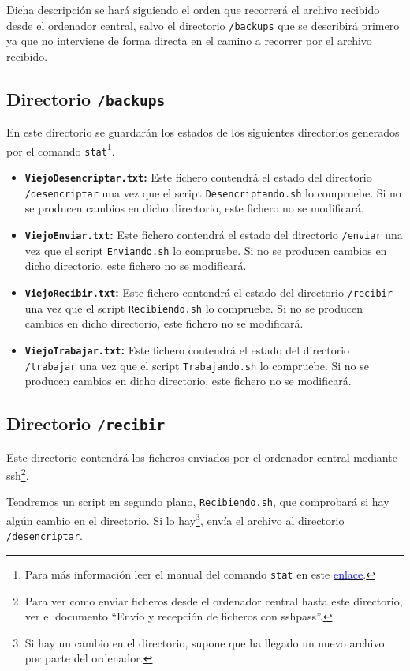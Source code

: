 \documentclass[12pt,letterpaper]{article}
\begin{document}
Dicha descripción se hará siguiendo el orden que recorrerá el archivo recibido desde el ordenador central, salvo el directorio \texttt{/backups} que se describirá primero ya que no interviene de forma directa en el camino a recorrer por el archivo recibido.

\subsection{Directorio \texttt{/backups}}
En este directorio se guardarán los estados de los siguientes directorios generados por el comando \texttt{stat}\footnote{Para más información leer el manual del comando \texttt{stat} en este \href{https://linux.die.net/man/2/stat}{\textcolor{blue}{enlace}}.}.
\begin{itemize}
	\item \textbf{\texttt{ViejoDesencriptar.txt}:} Este fichero contendrá el estado del directorio \texttt{/desencriptar} una vez que el script \texttt{Desencriptando.sh} lo compruebe. Si no se producen cambios en dicho directorio, este fichero no se modificará.
	\item \textbf{\texttt{ViejoEnviar.txt}:} Este fichero contendrá el estado del directorio \texttt{/enviar} una vez que el script \texttt{Enviando.sh} lo compruebe. Si no se producen cambios en dicho directorio, este fichero no se modificará.
	\item \textbf{\texttt{ViejoRecibir.txt}:} Este fichero contendrá el estado del directorio \texttt{/recibir} una vez que el script \texttt{Recibiendo.sh} lo compruebe. Si no se producen cambios en dicho directorio, este fichero no se modificará.
	\item \textbf{\texttt{ViejoTrabajar.txt}:} Este fichero contendrá el estado del directorio \texttt{/trabajar} una vez que el script \texttt{Trabajando.sh} lo compruebe. Si no se producen cambios en dicho directorio, este fichero no se modificará.
\end{itemize}

\subsection{Directorio \texttt{/recibir}}
Este directorio contendrá los ficheros enviados por el ordenador central mediante ssh\footnote{Para ver como enviar ficheros desde el ordenador central hasta este directorio, ver el documento ``Envío y recepción de ficheros con sshpass''.}.

Tendremos un script en segundo plano, \texttt{Recibiendo.sh}, que comprobará si hay algún cambio en el directorio. Si lo hay\footnote{Si hay un cambio en el directorio, supone que ha llegado un nuevo archivo por parte del ordenador.}, envía el archivo al directorio \texttt{/desencriptar}.
\end{document}
